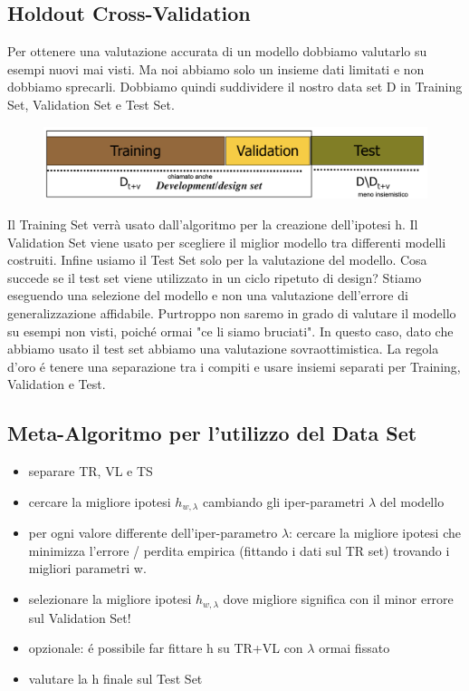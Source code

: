 \documentclass{article}
\begin{document}
\subsection{Holdout Cross-Validation}
Per ottenere una valutazione accurata di un modello dobbiamo valutarlo su esempi nuovi mai visti. Ma noi abbiamo solo un insieme dati limitati e non dobbiamo sprecarli. Dobbiamo quindi suddividere il nostro data set D in Training Set, Validation Set e Test Set.
\begin{figure}[H]
\centering
\includegraphics[scale=0.5]{Images/modelselectiontrvts.png}
\end{figure}
Il Training Set verrà usato dall'algoritmo per la creazione dell'ipotesi h. Il Validation Set viene usato per scegliere il miglior modello tra differenti modelli costruiti. Infine usiamo il Test Set solo per la valutazione del modello.\newline
Cosa succede se il test set viene utilizzato in un ciclo ripetuto di design? Stiamo eseguendo una selezione del modello e non una valutazione dell'errore di generalizzazione affidabile. Purtroppo non saremo in grado di valutare il modello su esempi non visti, poiché ormai "ce li siamo bruciati". In questo caso, dato che abbiamo usato il test set abbiamo una valutazione sovraottimistica. La regola d'oro é tenere una separazione tra i compiti e usare insiemi separati per Training, Validation e Test.

\subsection{Meta-Algoritmo per l'utilizzo del Data Set}
\begin{itemize}
    \item separare TR, VL e TS
    \item cercare la migliore ipotesi $h_{w,\lambda}$ cambiando gli iper-parametri $\lambda$ del modello
    \item per ogni valore differente dell'iper-parametro $\lambda$: cercare la migliore ipotesi che minimizza l'errore / perdita empirica (fittando i dati sul TR set) trovando i migliori parametri w.
    \item selezionare la migliore ipotesi $h_{w,\lambda}$ dove migliore significa con il minor errore sul Validation Set!
    \item opzionale: é possibile far fittare h su TR+VL con $\lambda$ ormai fissato
    \item valutare la h finale sul Test Set
\end{itemize}
\clearpage
\end{document}
